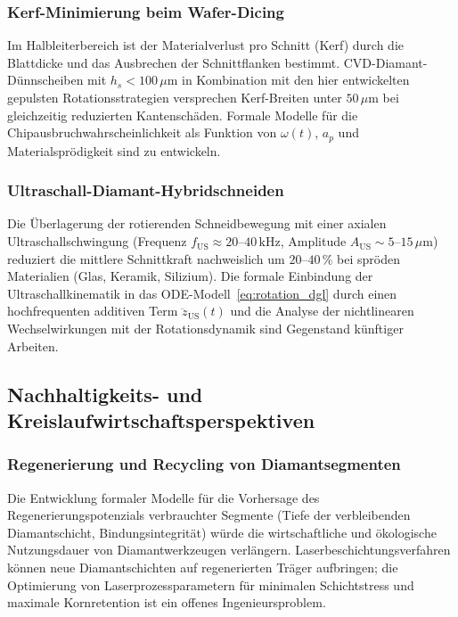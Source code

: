 ﻿\documentclass[a4paper,12pt]{article}
\theoremstyle{definition}
\begin{document}
\subsubsection{Kerf-Minimierung beim Wafer-Dicing}

Im Halbleiterbereich ist der Materialverlust pro Schnitt (Kerf) durch die
Blattdicke und das Ausbrechen der Schnittflanken bestimmt. CVD-Diamant-Dünnscheiben
mit $h_s < 100\,\mu\mathrm{m}$ in Kombination mit den hier entwickelten gepulsten
Rotationsstrategien versprechen Kerf-Breiten unter $50\,\mu\mathrm{m}$ bei gleichzeitig
reduzierten Kantenschäden. Formale Modelle für die Chipausbruchwahrscheinlichkeit
als Funktion von $\omega(t)$, $a_p$ und Materialsprödigkeit sind zu entwickeln.

\subsubsection{Ultraschall-Diamant-Hybridschneiden}

Die Überlagerung der rotierenden Schneidbewegung mit einer axialen Ultraschallschwingung
(Frequenz $f_{\mathrm{US}} \approx 20$--$40\,\mathrm{kHz}$, Amplitude $A_{\mathrm{US}} \sim 5$--$15\,\mu\mathrm{m}$)
reduziert die mittlere Schnittkraft nachweislich um $20$--$40\,\%$ bei spröden Materialien
(Glas, Keramik, Silizium). Die formale Einbindung der Ultraschallkinematik in das
ODE-Modell~\eqref{eq:rotation_dgl} durch einen hochfrequenten additiven Term
$\ddot{z}_{\mathrm{US}}(t)$ und die Analyse der nichtlinearen Wechselwirkungen mit
der Rotationsdynamik sind Gegenstand künftiger Arbeiten.

\subsection{Nachhaltigkeits- und Kreislaufwirtschaftsperspektiven}

\subsubsection{Regenerierung und Recycling von Diamantsegmenten}

Die Entwicklung formaler Modelle für die Vorhersage des Regenerierungspotenzials
verbrauchter Segmente (Tiefe der verbleibenden Diamantschicht, Bindungsintegrität)
würde die wirtschaftliche und ökologische Nutzungsdauer von Diamantwerkzeugen
verlängern. Laserbeschichtungsverfahren können neue Diamantschichten auf regenerierten
Träger aufbringen; die Optimierung von Laserprozessparametern für minimalen
Schichtstress und maximale Kornretention ist ein offenes Ingenieursproblem.
\end{document}
